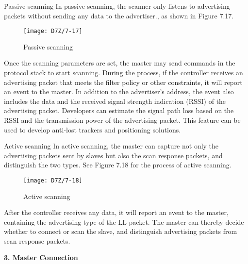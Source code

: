 \documentclass[a4paper,12pt]{book}
\begin{document}
\begin{term}{Passive scanning}
    In passive scanning, the scanner only listens to advertising packets without sending any data to the advertiser., as shown in Figure 7.17.

    \begin{figure}[!h]
        \centering
        \texttt{[image: D7Z/7-17]}
        \caption{Passive scanning}
    \end{figure}

    \vspace{6pt}
    Once the scanning parameters are set, the master may send commands in the protocol stack to start scanning. During the process, if the controller receives an advertising packet that meets the filter policy or other constraints, it will report an event to the master. In addition to the advertiser’s address, the event also includes the data and the received signal strength indication (RSSI) of the advertising packet. Developers can estimate the signal path loss based on the RSSI and the transmission power of the advertising packet. This feature can be used to develop anti-lost trackers and positioning solutions.
\end{term}

\begin{term}{Active scanning}
     In active scanning, the master can capture not only the advertising packets sent by slaves but also the scan response packets, and distinguish the two types. See Figure 7.18 for the process of active scanning.

    \begin{figure}[!h]
        \centering
        \texttt{[image: D7Z/7-18]}
        \caption{Active scanning}
    \end{figure}

    \vspace{6pt}
    After the controller receives any data, it will report an event to the master, containing the advertising type of the LL packet. The master can thereby decide whether to connect or scan the slave, and distinguish advertising packets from scan response packets.
\end{term}

\textbf{3. Master Connection}
\end{document}
